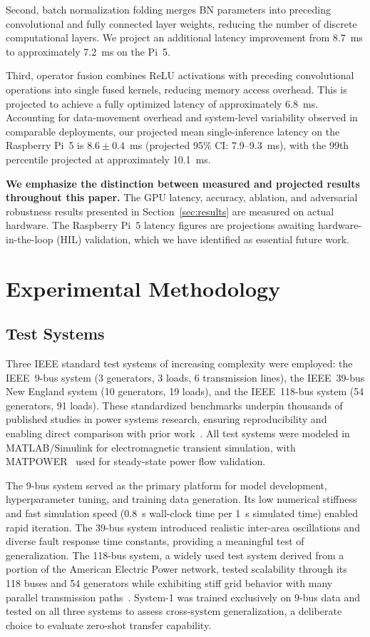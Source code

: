 \documentclass[journal]{IEEEtran}
\begin{document}
Second, batch normalization folding merges BN parameters into preceding convolutional and fully connected layer weights, reducing the number of discrete computational layers. We project an additional latency improvement from 8.7~ms to approximately 7.2~ms on the Pi~5.

Third, operator fusion combines ReLU activations with preceding convolutional operations into single fused kernels, reducing memory access overhead. This is projected to achieve a fully optimized latency of approximately 6.8~ms. Accounting for data-movement overhead and system-level variability observed in comparable deployments, our projected mean single-inference latency on the Raspberry Pi~5 is $8.6 \pm 0.4$~ms (projected 95\% CI: 7.9--9.3~ms), with the 99th percentile projected at approximately 10.1~ms.

\textbf{We emphasize the distinction between measured and projected results throughout this paper.} The GPU latency, accuracy, ablation, and adversarial robustness results presented in Section~\ref{sec:results} are measured on actual hardware. The Raspberry Pi~5 latency figures are projections awaiting hardware-in-the-loop (HIL) validation, which we have identified as essential future work.

\section{Experimental Methodology}
\label{sec:methodology}

\subsection{Test Systems}

Three IEEE standard test systems of increasing complexity were employed: the IEEE~9-bus system (3 generators, 3 loads, 6 transmission lines), the IEEE~39-bus New England system (10 generators, 19 loads), and the IEEE~118-bus system (54 generators, 91 loads). These standardized benchmarks underpin thousands of published studies in power systems research, ensuring reproducibility and enabling direct comparison with prior work~\cite{ref31}. All test systems were modeled in MATLAB/Simulink for electromagnetic transient simulation, with MATPOWER~\cite{ref32} used for steady-state power flow validation.

The 9-bus system served as the primary platform for model development, hyperparameter tuning, and training data generation. Its low numerical stiffness and fast simulation speed (0.8~s wall-clock time per 1~s simulated time) enabled rapid iteration. The 39-bus system introduced realistic inter-area oscillations and diverse fault response time constants, providing a meaningful test of generalization. The 118-bus system, a widely used test system derived from a portion of the American Electric Power network, tested scalability through its 118 buses and 54 generators while exhibiting stiff grid behavior with many parallel transmission paths~\cite{ref33}. System-1 was trained exclusively on 9-bus data and tested on all three systems to assess cross-system generalization, a deliberate choice to evaluate zero-shot transfer capability.
\end{document}
